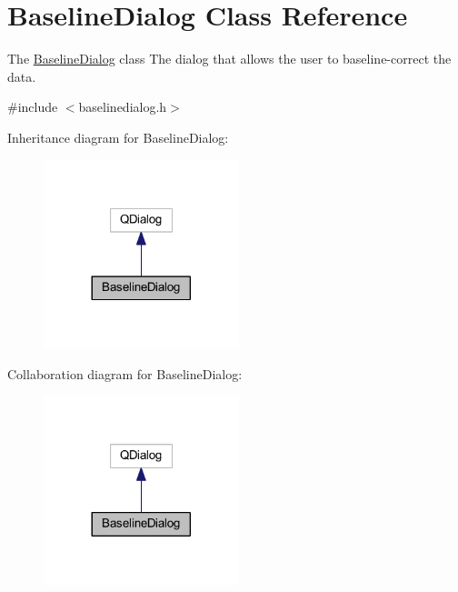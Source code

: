 \hypertarget{class_baseline_dialog}{\section{Baseline\+Dialog Class Reference}
\label{class_baseline_dialog}
}


The \hyperlink{class_baseline_dialog}{Baseline\+Dialog} class The dialog that allows the user to baseline-\/correct the data.  




{\ttfamily \#include $<$baselinedialog.\+h$>$}



Inheritance diagram for Baseline\+Dialog\+:\nopagebreak
\begin{figure}[H]
\begin{center}
\leavevmode
\includegraphics[width=161pt]{class_baseline_dialog__inherit__graph}
\end{center}
\end{figure}


Collaboration diagram for Baseline\+Dialog\+:\nopagebreak
\begin{figure}[H]
\begin{center}
\leavevmode
\includegraphics[width=161pt]{class_baseline_dialog__coll__graph}
\end{center}
\end{figure}
